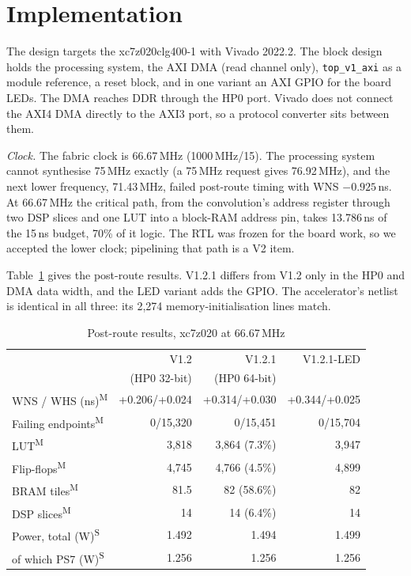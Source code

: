 \documentclass[conference]{IEEEtran}
\newcommand{\meas}{\textsuperscript{M}}   %
\newcommand{\synest}{\textsuperscript{S}} %
\newcommand{\code}[1]{\texttt{#1}}
\begin{document}
\section{Implementation}\label{sec:impl}

The design targets the xc7z020clg400-1 with Vivado 2022.2. The block design holds the processing
system, the AXI DMA (read channel only), \code{top\_v1\_axi} as a module reference, a reset
block, and in one variant an AXI GPIO for the board LEDs. The DMA reaches DDR through the HP0
port. Vivado does not connect the AXI4 DMA directly to the AXI3 port, so a protocol converter
sits between them.

\textit{Clock.} The fabric clock is 66.67\,MHz (1000\,MHz/15). The processing system cannot
synthesise 75\,MHz exactly (a 75\,MHz request gives 76.92\,MHz), and the next lower frequency,
71.43\,MHz, failed post-route timing with WNS $-0.925$\,ns. At 66.67\,MHz the critical path, from
the convolution's address register through two DSP slices and one LUT into a block-RAM address
pin, takes 13.786\,ns of the 15\,ns budget, 70\% of it logic. The RTL was frozen for the board
work, so we accepted the lower clock; pipelining that path is a V2 item.

Table~\ref{tab:impl} gives the post-route results. V1.2.1 differs from V1.2 only in the HP0 and
DMA data width, and the LED variant adds the GPIO. The accelerator's netlist is identical in all
three: its 2,274 memory-initialisation lines match.

\begin{table}[t]
\caption{Post-route results, xc7z020 at 66.67\,MHz}
\label{tab:impl}
\centering\footnotesize
\setlength{\tabcolsep}{3.5pt}
\begin{tabular}{@{}lrrr@{}}
\toprule
 & V1.2 & V1.2.1 & V1.2.1-LED \\
 & (HP0 32-bit) & (HP0 64-bit) & \\
\midrule
WNS / WHS (ns)\meas & +0.206/+0.024 & +0.314/+0.030 & +0.344/+0.025 \\
Failing endpoints\meas & 0/15,320 & 0/15,451 & 0/15,704 \\
LUT\meas & 3,818 & 3,864 (7.3\%) & 3,947 \\
Flip-flops\meas & 4,745 & 4,766 (4.5\%) & 4,899 \\
BRAM tiles\meas & 81.5 & 82 (58.6\%) & 82 \\
DSP slices\meas & 14 & 14 (6.4\%) & 14 \\
Power, total (W)\synest & 1.492 & 1.494 & 1.499 \\
\quad of which PS7 (W)\synest & 1.256 & 1.256 & 1.256 \\
\bottomrule
\end{tabular}
\end{table}
\end{document}
